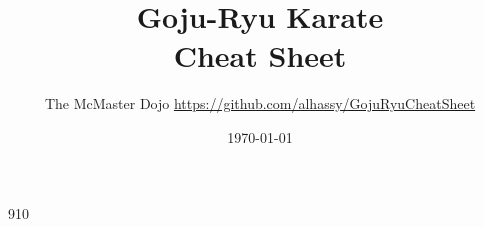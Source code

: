 \documentclass[11pt]{article}
\author{The McMaster Dojo {\tiny\hspace{6em}\url{ https://github.com/alhassy/GojuRyuCheatSheet } }}
\date{\today}
\title{Goju-Ryu Karate\\\medskip
\large Cheat Sheet}
\def\maketitle#1{}
\begin{document}
\maketitle

\fontsize{9}{10}\selectfont

\theauthor \hfill \thedate
\hline
{\center \large\bf \thetitle \\ }




%
% 
\makeatletter
\renewcommand\section[1]{
  \@startsection {section}{1}{0ex}%
                 {-3.5ex \@plus -1ex \@minus -.2ex}%
                 {-1em}%
		 { \color{black}\normalfont\bfseries}* {\fbox{#1} \vspace{1ex}\newline }}
		 
\makeatother


\def\labelitemi{$\diamond$}
\def\labelitemii{$\circ$}
\def\labelitemiii{$\star$}

% 


\renewenvironment{parallel}[1][2] %
 {
  \setlength{\columnseprule}{2pt}
  \begin{minipage}[t]{\linewidth} %
  \begin{multicols}{#1}  %
 }
 { 
  \end{multicols}
  \end{minipage}
 }

\newenvironment{parallel3}
 {
  \setlength{\columnseprule}{2pt}
  \begin{minipage}[t]{\linewidth} %
  \begin{multicols}{3}
 }
 { 
  \end{multicols}
  \end{minipage}
 }
\end{document}
